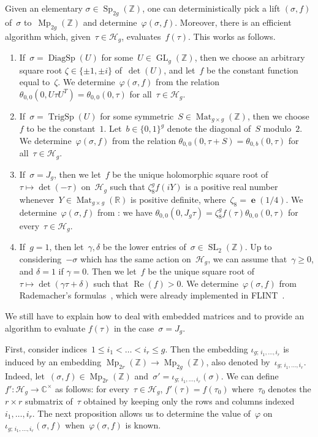 \documentclass[12pt,oneside]{amsart}
\numberwithin{equation}{section}
\theoremstyle{definition}
\newcommand{\Z}{\mathbb{Z}}
\newcommand{\R}{\mathbb{R}}
\newcommand{\C}{\mathbb{C}}
\newcommand{\Half}{\mathcal{H}}
\renewcommand{\phi}{\varphi}
\newcommand{\embedsp}[2]{\iota_{#1;\,#2}}
\DeclareMathOperator{\re}{Re}
\DeclareMathOperator{\Sp}{Sp}
\DeclareMathOperator{\SL}{SL}
\DeclareMathOperator{\GL}{GL}
\DeclareMathOperator{\Mp}{Mp}
\DeclareMathOperator{\Mat}{Mat}
\DeclareMathOperator{\TrigSp}{TrigSp}
\DeclareMathOperator{\DiagSp}{DiagSp}
\DeclareMathOperator{\e}{\mathbf{e}}
\begin{document}
Given an elementary $\sigma\in \Sp_{2g}(\Z)$, one can deterministically pick a
lift $(\sigma,f)$ of~$\sigma$ to~$\Mp_{2g}(\Z)$ and
determine~$\phi(\sigma,f)$. Moreover, there is an efficient algorithm which,
given~$\tau\in \Half_g$, evaluates~$f(\tau)$. This works as follows.
\begin{enumerate}
\item If~$\sigma = \DiagSp(U)$ for some~$U\in \GL_g(\Z)$, then we choose an
  arbitrary square root $\zeta\in \{\pm 1,\pm i\}$ of~$\det(U)$, and let~$f$ be
  the constant function equal to~$\zeta$. We determine~$\phi(\sigma,f)$ from
  the relation $\theta_{0,0}(0,U\tau U^T) = \theta_{0,0}(0,\tau)$ for
  all~$\tau\in \Half_g$.
\item If~$\sigma = \TrigSp(U)$ for some symmetric~$S\in \Mat_{g\times g}(\Z)$,
  then we choose~$f$ to be the constant~$1$. Let~$b\in\{0,1\}^g$ denote the diagonal
  of~$S$ modulo~$2$. We determine~$\phi(\sigma,f)$ from the relation
  $\theta_{0,0}(0,\tau + S) = \theta_{0,b}(0,\tau)$ for all~$\tau\in \Half_g$.
\item If~$\sigma = J_g$, then we let~$f$ be the unique holomorphic square root
  of $\tau\mapsto\det(-\tau)$ on~$\Half_g$ such that $\zeta_8^g f(iY)$ is a
  positive real number whenever~$Y\in \Mat_{g\times g}(\R)$ is positive
  definite, where~$\zeta_8 = \e(1/4)$. We determine~$\phi(\sigma,f)$ from
  \cite[Case III p.\,195]{mumfordTataLecturesTheta1983}: we have
  $\theta_{0,0}(0,J_g\tau) = \zeta_8^g f(\tau) \theta_{0,0}(0,\tau)$ for
  every~$\tau\in \Half_g$.
\item If~$g = 1$, then let~$\gamma,\delta$ be the lower entries
  of~$\sigma\in \SL_2(\Z)$. Up to considering~$-\sigma$ which has the same
  action on~$\Half_g$, we can assume that~$\gamma\geq 0$, and $\delta = 1$ if
  $\gamma = 0$. Then we let~$f$ be the unique square root of
  $\tau\mapsto \det(\gamma\tau + \delta)$ such that $\re(f)>0$. We
  determine~$\phi(\sigma,f)$ from Rademacher's
  formulas~\cite{rademacherTopicsAnalyticNumber1973}, which were already
  implemented in FLINT~\cite{engeShortAdditionSequences2018}.
\end{enumerate}

We still have to explain how to deal with embedded matrices and to provide an
algorithm to evaluate $f(\tau)$ in the case~$\sigma = J_g$.

First, consider indices~$1\leq i_1<\ldots < i_r\leq g$. Then the embedding
$\embedsp{g}{i_1,\ldots,i_r}$ is induced by an embedding
$\Mp_{2r}(\Z)\to \Mp_{2g}(\Z)$, also denoted
by~$\embedsp{g}{i_1,\ldots,i_r}$. Indeed, let~$(\sigma,f)\in \Mp_{2r}(\Z)$
and~$\sigma' = \embedsp{g}{i_1,\ldots,i_r}(\sigma)$. We can
define~$f':\Half_g\to \C^\times$ as follows: for every~$\tau\in \Half_g$,
$f'(\tau) = f(\tau_0)$ where~$\tau_0$ denotes the $r\times r$ submatrix
of~$\tau$ obtained by keeping only the rows and columns indexed
$i_1,\ldots,i_r$. The next proposition allows us to determine the value
of~$\phi$ on~$\embedsp{g}{i_1,\ldots,i_r}(\sigma,f)$ when~$\phi(\sigma,f)$ is
known.
\end{document}
